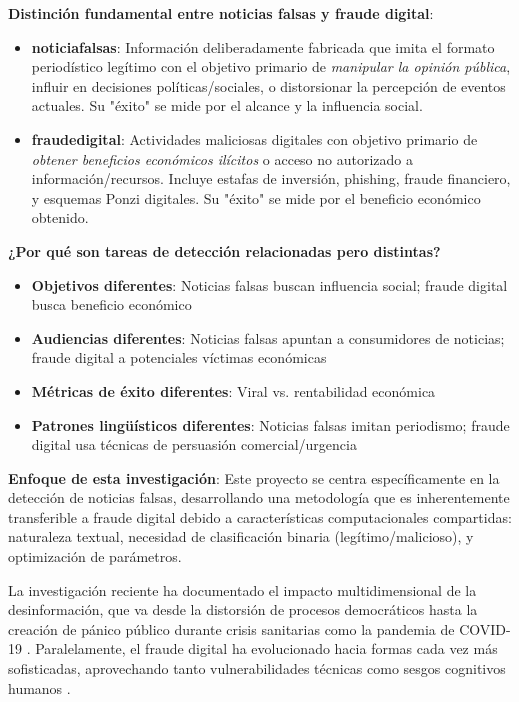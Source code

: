 \textbf{Distinción fundamental entre noticias falsas y fraude digital}: 

\begin{itemize}
    \item \textbf{\Glspl{noticiafalsa}}: Información deliberadamente fabricada que imita el formato periodístico legítimo con el objetivo primario de \textit{manipular la opinión pública}, influir en decisiones políticas/sociales, o distorsionar la percepción de eventos actuales. Su "éxito" se mide por el alcance y la influencia social.
    
    \item \textbf{\Gls{fraudedigital}}: Actividades maliciosas digitales con objetivo primario de \textit{obtener beneficios económicos ilícitos} o acceso no autorizado a información/recursos. Incluye estafas de inversión, phishing, fraude financiero, y esquemas Ponzi digitales. Su "éxito" se mide por el beneficio económico obtenido.
\end{itemize}

\textbf{¿Por qué son tareas de detección relacionadas pero distintas?}
\begin{itemize}
    \item \textbf{Objetivos diferentes}: Noticias falsas buscan influencia social; fraude digital busca beneficio económico
    \item \textbf{Audiencias diferentes}: Noticias falsas apuntan a consumidores de noticias; fraude digital a potenciales víctimas económicas
    \item \textbf{Métricas de éxito diferentes}: Viral vs. rentabilidad económica
    \item \textbf{Patrones lingüísticos diferentes}: Noticias falsas imitan periodismo; fraude digital usa técnicas de persuasión comercial/urgencia
\end{itemize}

\textbf{Enfoque de esta investigación}: Este proyecto se centra específicamente en la detección de noticias falsas, desarrollando una metodología que es inherentemente transferible a fraude digital debido a características computacionales compartidas: naturaleza textual, necesidad de clasificación binaria (legítimo/malicioso), y optimización de parámetros.

La investigación reciente ha documentado el impacto multidimensional de la desinformación, que va desde la distorsión de procesos democráticos \cite{ali2020posttruth} hasta la creación de pánico público durante crisis sanitarias como la pandemia de COVID-19 \cite{perez2020fake}. Paralelamente, el fraude digital ha evolucionado hacia formas cada vez más sofisticadas, aprovechando tanto vulnerabilidades técnicas como sesgos cognitivos humanos \cite{ali2021fake}.

